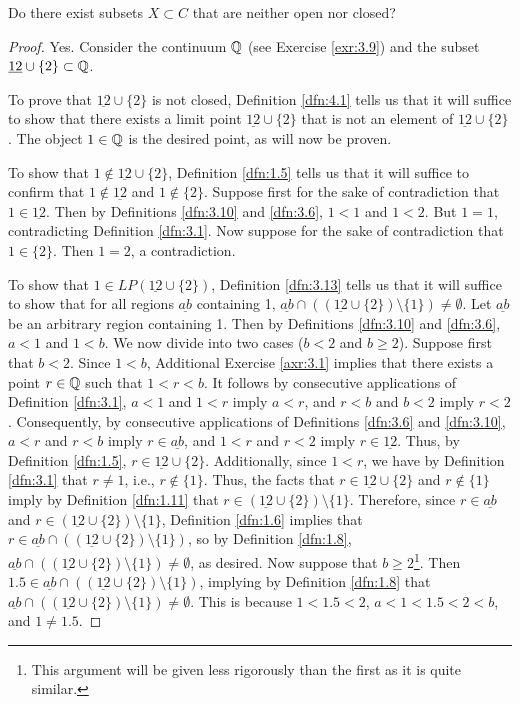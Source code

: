 \documentclass[../main.tex]{subfiles}
\begin{document}
\begin{exercise}\label{exr:4.15}
    Do there exist subsets $X\subset C$ that are neither open nor closed?
    \begin{proof}
        Yes. Consider the continuum $\mathbb{Q}$ (see Exercise \ref{exr:3.9}) and the subset $\underline{12}\cup\{2\}\subset\mathbb{Q}$.\par\smallskip
        To prove that $\underline{12}\cup\{2\}$ is not closed, Definition \ref{dfn:4.1} tells us that it will suffice to show that there exists a limit point $\underline{12}\cup\{2\}$ that is not an element of $\underline{12}\cup\{2\}$. The object $1\in\mathbb{Q}$ is the desired point, as will now be proven.\par
        To show that $1\notin\underline{12}\cup\{2\}$, Definition \ref{dfn:1.5} tells us that it will suffice to confirm that $1\notin\underline{12}$ and $1\notin\{2\}$. Suppose first for the sake of contradiction that $1\in\underline{12}$. Then by Definitions \ref{dfn:3.10} and \ref{dfn:3.6}, $1<1$ and $1<2$. But $1=1$, contradicting Definition \ref{dfn:3.1}. Now suppose for the sake of contradiction that $1\in\{2\}$. Then $1=2$, a contradiction.\par
        To show that $1\in LP(\underline{12}\cup\{2\})$, Definition \ref{dfn:3.13} tells us that it will suffice to show that for all regions $\underline{ab}$ containing 1, $\underline{ab}\cap((\underline{12}\cup\{2\})\setminus\{1\})\neq\emptyset$. Let $\underline{ab}$ be an arbitrary region containing 1. Then by Definitions \ref{dfn:3.10} and \ref{dfn:3.6}, $a<1$ and $1<b$. We now divide into two cases ($b<2$ and $b\geq 2$). Suppose first that $b<2$. Since $1<b$, Additional Exercise \ref{axr:3.1} implies that there exists a point $r\in\mathbb{Q}$ such that $1<r<b$. It follows by consecutive applications of Definition \ref{dfn:3.1}, $a<1$ and $1<r$ imply $a<r$, and $r<b$ and $b<2$ imply $r<2$. Consequently, by consecutive applications of Definitions \ref{dfn:3.6} and \ref{dfn:3.10}, $a<r$ and $r<b$ imply $r\in\underline{ab}$, and $1<r$ and $r<2$ imply $r\in\underline{12}$. Thus, by Definition \ref{dfn:1.5}, $r\in\underline{12}\cup\{2\}$. Additionally, since $1<r$, we have by Definition \ref{dfn:3.1} that $r\neq 1$, i.e., $r\notin\{1\}$. Thus, the facts that $r\in\underline{12}\cup\{2\}$ and $r\notin\{1\}$ imply by Definition \ref{dfn:1.11} that $r\in(\underline{12}\cup\{2\})\setminus\{1\}$. Therefore, since $r\in\underline{ab}$ and $r\in(\underline{12}\cup\{2\})\setminus\{1\}$, Definition \ref{dfn:1.6} implies that $r\in\underline{ab}\cap((\underline{12}\cup\{2\})\setminus\{1\})$, so by Definition \ref{dfn:1.8}, $\underline{ab}\cap((\underline{12}\cup\{2\})\setminus\{1\})\neq\emptyset$, as desired. Now suppose that $b\geq 2$\footnote{This argument will be given less rigorously than the first as it is quite similar.}. Then $1.5\in\underline{ab}\cap((\underline{12}\cup\{2\})\setminus\{1\})$, implying by Definition \ref{dfn:1.8} that $\underline{ab}\cap((\underline{12}\cup\{2\})\setminus\{1\})\neq\emptyset$. This is because $1<1.5<2$, $a<1<1.5<2<b$, and $1\neq 1.5$.\par\smallskip

\end{proof}
\end{exercise}
\end{document}
